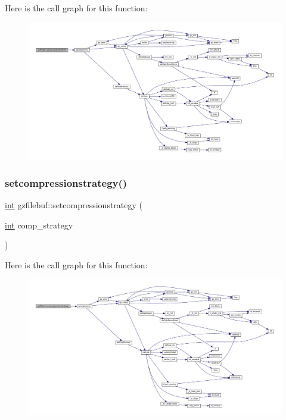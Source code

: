 Here is the call graph for this function\+:
\nopagebreak
\begin{figure}[H]
\begin{center}
\leavevmode
\includegraphics[width=350pt]{classgzfilebuf_a8bbfda3e29baf20e4330e3a9d7ee4a54_cgraph}
\end{center}
\end{figure}
\mbox{\label{classgzfilebuf_a47d4b9f1257fd12dd21847b71ad1d49d}} 
\subsubsection{\texorpdfstring{setcompressionstrategy()}{setcompressionstrategy()}}
{\footnotesize\ttfamily \mbox{\hyperlink{ioapi_8h_a787fa3cf048117ba7123753c1e74fcd6}{int}} gzfilebuf\+::setcompressionstrategy (\begin{DoxyParamCaption}\item[{\mbox{\hyperlink{ioapi_8h_a787fa3cf048117ba7123753c1e74fcd6}{int}}}]{comp\+\_\+strategy }\end{DoxyParamCaption})}

Here is the call graph for this function\+:
\nopagebreak
\begin{figure}[H]
\begin{center}
\leavevmode
\includegraphics[width=350pt]{classgzfilebuf_a47d4b9f1257fd12dd21847b71ad1d49d_cgraph}
\end{center}
\end{figure}
\mbox{\label{classgzfilebuf_aa6c80a4f96fdc5e4a991113699428164}} 
